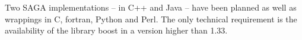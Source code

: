 




    Two SAGA implementations  -- in C++ and Java --  have been planned as
    well as wrappings in C, fortran, Python and Perl. The only 
    technical requirement is the availability of the library boost
    in a version higher than 1.33.

